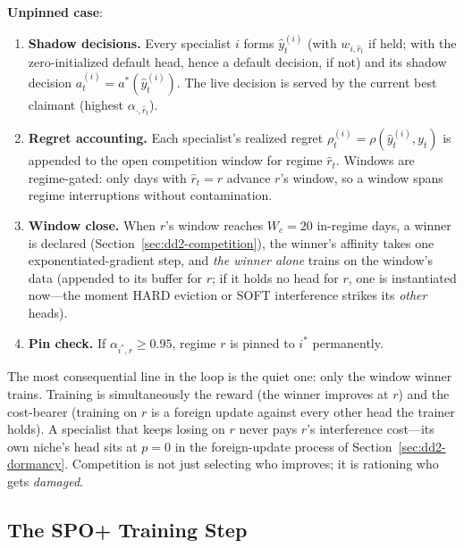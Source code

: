 \textbf{Unpinned case}:
\begin{enumerate}
  \item \textbf{Shadow decisions.} Every specialist $i$ forms
        $\hat y^{(i)}_t$ (with $w_{i, \hat r_t}$ if held; with the
        zero-initialized default head, hence a default decision, if not) and
        its shadow decision $a^{(i)}_t = a^{*}(\hat y^{(i)}_t)$. The live
        decision is served by the current best claimant (highest
        $\alpha_{\cdot, \hat r_t}$).
  \item \textbf{Regret accounting.} Each specialist's realized regret
        $\rho^{(i)}_t = \rho(\hat y^{(i)}_t, y_t)$ is appended to the open
        competition window for regime $\hat r_t$. Windows are regime-gated:
        only days with $\hat r_t = r$ advance $r$'s window, so a window
        spans regime interruptions without contamination.
  \item \textbf{Window close.} When $r$'s window reaches $W_c = 20$
        in-regime days, a winner is declared
        (Section~\ref{sec:dd2-competition}), the winner's affinity takes one
        exponentiated-gradient step, and \emph{the winner alone} trains on
        the window's data (appended to its buffer for $r$; if it holds no
        head for $r$, one is instantiated now---the moment HARD eviction or
        SOFT interference strikes its \emph{other} heads).
  \item \textbf{Pin check.} If $\alpha_{i^{*}, r} \ge 0.95$, regime $r$ is
        pinned to $i^{*}$ permanently.
\end{enumerate}

\begin{intuition}[title={Why losers do not train}]
The most consequential line in the loop is the quiet one: only the window
winner trains. Training is simultaneously the reward (the winner improves at
$r$) and the cost-bearer (training on $r$ is a foreign update against every
other head the trainer holds). A specialist that keeps losing on $r$ never
pays $r$'s interference cost---its own niche's head sits at $p = 0$ in the
foreign-update process of Section~\ref{sec:dd2-dormancy}. Competition is not
just selecting who improves; it is rationing who gets \emph{damaged}.
\end{intuition}

\subsection{The SPO+ Training Step}
\label{sec:dd2-training}

